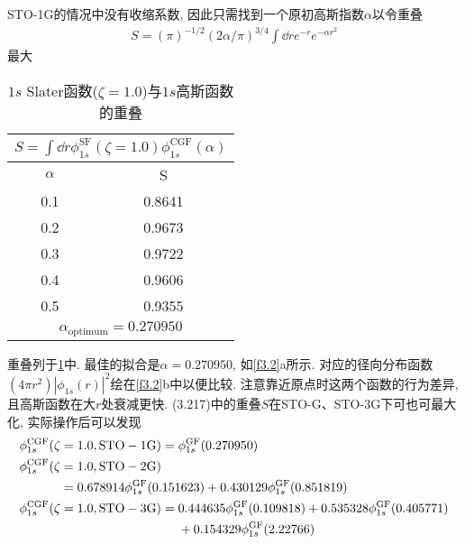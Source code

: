 STO-1G的情况中没有收缩系数, 因此只需找到一个原初高斯指数$\alpha$以令重叠
\begin{align}
S = (\pi)^{-1/2}(2\alpha/\pi)^{3/4}\int\dd{r}e^{-r}e^{-\alpha r^2}
\end{align}
最大
\begin{table}[H]
	\centering
	\caption{$1s$ Slater函数($\zeta=1.0$)与$1s$高斯函数的重叠}
	\begin{tabular}{cc}
		\multicolumn{2}{c}{$ S=\int\dd{r}\phi_{1s}^\mathrm{SF}(\zeta=1.0)\phi_{1s}^\mathrm{CGF}(\alpha)$}\\\hline
		$\alpha$ & S\\\hline
		0.1      & 0.8641\\
		0.2      & 0.9673\\
		0.3      & 0.9722\\
		0.4      & 0.9606\\
		0.5      & 0.9355\\\hline
		\multicolumn{2}{c}{$\alpha_\mathrm{optimum}=0.270950$}
	\end{tabular}
	\label{t3.1}
\end{table}
重叠列于\ref{t3.1}中. 最佳的拟合是$\alpha=0.270950$, 如\ref{f3.2}a所示. 对应的径向分布函数$(4\pi r^2)|\phi_{1s}(r)|^2$绘在\ref{f3.2}b中以便比较. 注意靠近原点时这两个函数的行为差异, 且高斯函数在大$r$处衰减更快. (3.217)中的重叠$S$在STO-G、STO-3G下可也可最大化, 实际操作后可以发现
\begin{alignat}{2}
\label{3.219}
\phi_{1s}^\mathrm{CGF}(\zeta&=1.0,\mathrm{STO-1G}) = \phi_{1s}^\mathrm{GF}(0.270950)\\
\phi_{1s}^\mathrm{CGF}(\zeta&=1.0,\mathrm{STO-2G})\notag\\
                            &=0.678914\phi_{1s}^\mathrm{GF}(0.151623) +0.430129\phi_{1s}^\mathrm{GF}(0.851819)\\
\phi_{1s}^\mathrm{CGF}(\zeta&=1.0,\mathrm{STO-3G})=
\begin{alignedat}[t]{1}&0.444635\phi_{1s}^\mathrm{GF}(0.109818) + 0.535328\phi_{1s}^\mathrm{GF}(0.405771)\\& + 0.154329\phi_{1s}^\mathrm{GF}(2.22766)\end{alignedat}
\end{alignat}

